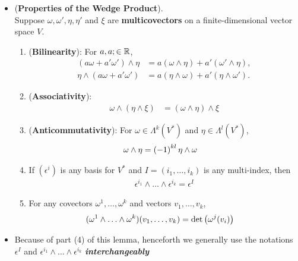 \documentclass[11pt]{article}
\begin{document}
\begin{itemize}
\item \begin{proposition}\label{prop: wedge_product_property} (\textbf{Properties of the Wedge Product}). \\
Suppose $\omega, \omega', \eta, \eta'$ and $\xi$ are \textbf{multicovectors} on a finite-dimensional vector space $V$.
\begin{enumerate}
\item (\textbf{Bilinearity}): For $a,a; \in {\mathbb R}$,
\begin{align*}
(a \omega + a' \omega')\wedge \eta &=  a (\omega \wedge \eta)+a' (\omega' \wedge \eta),\\
\eta \wedge  (a \omega + a' \omega')&=  a ( \eta \wedge \omega)+a' ( \eta  \wedge \omega').
\end{align*}
\item (\textbf{Associativity}):
\begin{align*}
\omega \wedge (\eta  \wedge \xi) &= (\omega \wedge \eta ) \wedge \xi 
\end{align*}
\item (\textbf{Anticommutativity}): For $\omega \in \Lambda^k(V^{*})$ and $\eta \in \Lambda^l(V^{*})$,
\begin{align}
\omega \wedge \eta &= \left(-1\right)^{kl} \eta \wedge \omega \label{eqn: wedge_product_anticommutative}
\end{align}
\item  If $(\epsilon^i)$ is any basis for $V^{*}$ and $I=(i_1,\ldots, i_k)$ is any multi-index, then
\begin{align}
\epsilon^{i_1} \wedge \ldots \wedge \epsilon^{i_k} = \epsilon^{I} \label{eqn: wedge_product_basis}
\end{align}
\item For any covectors $\omega^1,\ldots, \omega^k$ and vectors $v_1,\ldots,v_k$,
\begin{align}
(\omega^1 \wedge \ldots \wedge \omega^k)(v_1,\ldots,v_k) &= \det\left(\omega^{j}(v_i)\right) \label{eqn: wedge_product_determinant}
\end{align}
\end{enumerate}
\end{proposition}

\item \begin{remark}
Because of part (4) of this lemma, henceforth we generally use the notations $\epsilon^I$ and $\epsilon^{i_1}  \wedge \ldots \wedge \epsilon^{i_k}$ \emph{\textbf{interchangeably}}
\end{remark}


\end{itemize}
\end{document}
